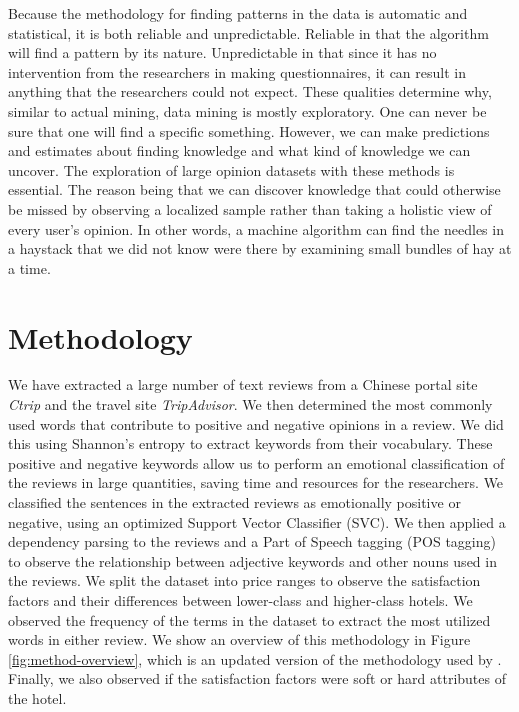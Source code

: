\documentclass[smallextended,natbib]{svjour3}       %
\begin{document}
    Because the methodology for finding patterns in the data is automatic and statistical, it is both reliable and unpredictable. Reliable in that the algorithm will find a pattern by its nature. Unpredictable in that since it has no intervention from the researchers in making questionnaires, it can result in anything that the researchers could not expect. These qualities determine why, similar to actual mining, data mining is mostly exploratory. One can never be sure that one will find a specific something. However, we can make predictions and estimates about finding knowledge and what kind of knowledge we can uncover. The exploration of large opinion datasets with these methods is essential. The reason being that we can discover knowledge that could otherwise be missed by observing a localized sample rather than taking a holistic view of every user's opinion. In other words, a machine algorithm can find the needles in a haystack that we did not know were there by examining small bundles of hay at a time.


\section{Methodology}\label{method}

  We have extracted a large number of text reviews from a Chinese portal site \textit{Ctrip} and the travel site \textit{TripAdvisor}. We then determined the most commonly used words that contribute to positive and negative opinions in a review. We did this using Shannon's entropy to extract keywords from their vocabulary. These positive and negative keywords allow us to perform an emotional classification of the reviews in large quantities, saving time and resources for the researchers. We classified the sentences in the extracted reviews as emotionally positive or negative, using an optimized Support Vector Classifier (SVC). We then applied a dependency parsing to the reviews and a Part of Speech tagging (POS tagging) to observe the relationship between adjective keywords and other nouns used in the reviews. We split the dataset into price ranges to observe the satisfaction factors and their differences between lower-class and higher-class hotels. We observed the frequency of the terms in the dataset to extract the most utilized words in either review. We show an overview of this methodology in Figure \ref{fig:method-overview}, which is an updated version of the methodology used by \cite{Aleman2018ICAROB}. Finally, we also observed if the satisfaction factors were soft or hard attributes of the hotel.
\end{document}
